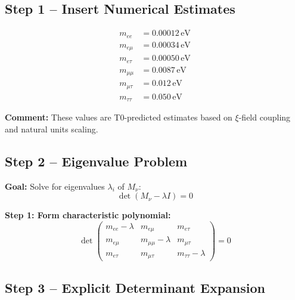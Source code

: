 \documentclass[12pt,a4paper]{article}
\begin{document}
\subsection{Step 1 – Insert Numerical Estimates}

\begin{align}
	m_{ee} &= 0.00012 \, \text{eV} \\
	m_{e\mu} &= 0.00034 \, \text{eV} \\
	m_{e\tau} &= 0.00050 \, \text{eV} \\
	m_{\mu\mu} &= 0.0087 \, \text{eV} \\
	m_{\mu\tau} &= 0.012 \, \text{eV} \\
	m_{\tau\tau} &= 0.050 \, \text{eV}
\end{align}

\textbf{Comment:} These values are T0-predicted estimates based on $\xi$-field coupling and natural units scaling.

\subsection{Step 2 – Eigenvalue Problem}

\textbf{Goal:} Solve for eigenvalues $\lambda_i$ of $M_\nu$:  
\begin{equation}
	\det(M_\nu - \lambda I) = 0
\end{equation}

\textbf{Step 1: Form characteristic polynomial:}
\begin{equation}
	\det
	\begin{pmatrix}
		m_{ee}-\lambda & m_{e\mu} & m_{e\tau} \\
		m_{e\mu} & m_{\mu\mu}-\lambda & m_{\mu\tau} \\
		m_{e\tau} & m_{\mu\tau} & m_{\tau\tau}-\lambda
	\end{pmatrix} = 0
\end{equation}

\subsection{Step 3 – Explicit Determinant Expansion}
\end{document}

